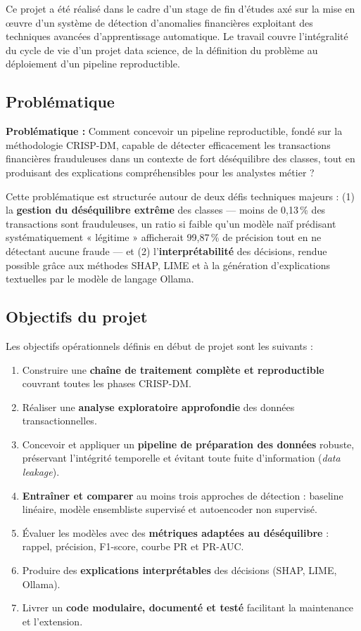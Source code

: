 Ce projet a été réalisé dans le cadre d'un stage de fin d'études axé sur la mise en œuvre
d'un système de détection d'anomalies financières exploitant des techniques avancées
d'apprentissage automatique. Le travail couvre l'intégralité du cycle de vie d'un projet
data science, de la définition du problème au déploiement d'un pipeline reproductible.

\subsection{Problématique}

\begin{definitionbox}
\textbf{Problématique :} Comment concevoir un pipeline reproductible, fondé sur la
méthodologie CRISP-DM, capable de détecter efficacement les transactions financières
frauduleuses dans un contexte de fort déséquilibre des classes, tout en produisant des
explications compréhensibles pour les analystes métier ?
\end{definitionbox}

Cette problématique est structurée autour de deux défis techniques majeurs : (1) la
\textbf{gestion du déséquilibre extrême} des classes --- moins de 0,13\,\% des transactions
sont frauduleuses, un ratio si faible qu'un modèle naïf prédisant systématiquement
« légitime » afficherait 99,87\,\% de précision tout en ne détectant aucune fraude ---
et (2) l'\textbf{interprétabilité} des décisions, rendue possible grâce aux méthodes SHAP,
LIME et à la génération d'explications textuelles par le modèle de langage Ollama.

\subsection{Objectifs du projet}

Les objectifs opérationnels définis en début de projet sont les suivants :

\begin{enumerate}
  \item Construire une \textbf{chaîne de traitement complète et reproductible} couvrant
    toutes les phases CRISP-DM.
  \item Réaliser une \textbf{analyse exploratoire approfondie} des données transactionnelles.
  \item Concevoir et appliquer un \textbf{pipeline de préparation des données} robuste,
    préservant l'intégrité temporelle et évitant toute fuite d'information
    (\textit{data leakage}).
  \item \textbf{Entraîner et comparer} au moins trois approches de détection : baseline
    linéaire, modèle ensembliste supervisé et autoencoder non supervisé.
  \item Évaluer les modèles avec des \textbf{métriques adaptées au déséquilibre} : rappel,
    précision, F1-score, courbe PR et PR-AUC.
  \item Produire des \textbf{explications interprétables} des décisions (SHAP, LIME, Ollama).
  \item Livrer un \textbf{code modulaire, documenté et testé} facilitant la maintenance
    et l'extension.
\end{enumerate}


